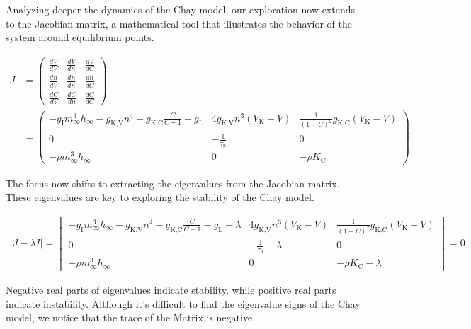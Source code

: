 \documentclass[../Orator]{subfiles}
\begin{document}
Analyzing deeper the dynamics of the Chay model, our exploration now extends to the Jacobian matrix, a mathematical tool that illustrates the behavior of the system around equilibrium points.

\begin{align*}
     J &= \begin{pmatrix}
        \frac{dV}{dV} & \frac{dV}{dn} & \frac{dV}{dC} \\
        \frac{dn}{dV} & \frac{dn}{dn} & \frac{dn}{dC} \\
        \frac{dC}{dV} & \frac{dC}{dn} & \frac{dC}{dC}
    \end{pmatrix} \\
      &= 
    \begin{pmatrix}
        -g_{\text{I}} m_{\infty}^3 h_{\infty} - g_{\text{K,V}} n^4 - g_{\text{K,C}} \frac{C}{C+1} - g_{\text{L}} & 4 g_{\text{K,V}} n^3 (V_{\text{K}} - V) & \frac{1}{(1+C)^2} g_{\text{K,C}} (V_{\text{K}} - V) \\
        0 & -\frac{1}{\tau_{\text{n}}} & 0 \\
        -\rho m_{\infty}^3 h_{\infty} & 0 & -\rho K_{\text{C}}
    \end{pmatrix}
\end{align*}

The focus now shifts to extracting the eigenvalues from the Jacobian matrix. These eigenvalues are key to exploring the stability of the Chay model.

\begin{align*}
    |J - \lambda I| = 
    \begin{vmatrix}
         -g_{\text{I}} m_{\infty}^3 h_{\infty} - g_{\text{K,V}} n^4 - g_{\text{K,C}} \frac{C}{C+1} - g_{\text{L}} - \lambda & 4 g_{\text{K,V}} n^3 (V_{\text{K}} - V) & \frac{1}{(1+C)^2} g_{\text{K,C}} (V_{\text{K}} - V) \\
         0 & -\frac{1}{\tau_{\text{n}}} - \lambda & 0 \\
         -\rho m_{\infty}^3 h_{\infty} & 0 & -\rho K_{\text{C}} - \lambda
    \end{vmatrix} = 0
\end{align*}

Negative real parts of eigenvalues indicate  stability, while positive real parts  indicate instability. Although it's difficult to find the eigenvalue signs of the Chay model, we notice that the trace of the Matrix is negative.
\end{document}
